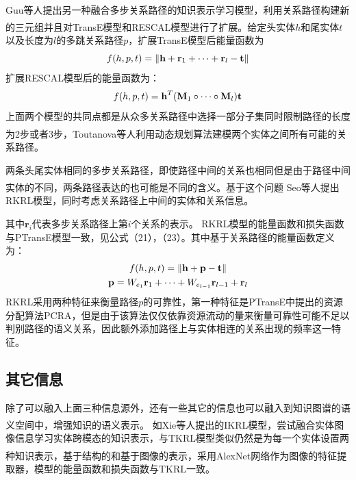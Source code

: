 \documentclass[twocolumn]{article}
\newcommand{\upcite}[1]{\textsuperscript{\textsuperscript{\cite{#1}}}}
\begin{document}
Guu等人\upcite{Guu}提出另一种融合多步关系路径的知识表示学习模型，利用关系路径构建新的三元组并且对TransE模型和RESCAL\upcite{RESCAL}模型进行了扩展。给定头实体$h$和尾实体$t$以及长度为$l$的多跳关系路径$p$，扩展TransE模型后能量函数为
\begin{equation}
	f(h,p,t)=\left \| \textbf{h}+\textbf{r}_1+\cdots+\textbf{r}_l-\textbf{t} \right \| \notag
\end{equation}
扩展RESCAL模型后的能量函数为：
\begin{equation}
	f(h,p,t)=\textbf{h}^T(\textbf{M}_1\circ\cdots\circ\textbf{M}_l)\textbf{t} \notag
\end{equation}
上面两个模型的共同点都是从众多关系路径中选择一部分子集同时限制路径的长度为2步或者3步，Toutanova等人\upcite{Toutanova}利用动态规划算法建模两个实体之间所有可能的关系路径。

两条头尾实体相同的多步关系路径，即使路径中间的关系也相同但是由于路径中间实体的不同，两条路径表达的也可能是不同的含义。基于这个问题
Seo等人\upcite{RKRL}提出RKRL模型，同时考虑关系路径上中间的实体和关系信息。

其中$\textbf{r}_i$代表多步关系路径上第$i$个关系的表示。
RKRL模型的能量函数和损失函数与PTransE模型一致，见公式（21），（23）。其中基于关系路径的能量函数定义为：
\begin{gather}
f(h,p,t)=\left \|\textbf{h}+\textbf{p}-\textbf{t} \right \| \notag \\
\textbf{p}=W_{e_1}\textbf{r}_1+\cdots+W_{e_{l-1}}\textbf{r}_{l-1}+\textbf{r}_l \notag
\end{gather}
RKRL采用两种特征来衡量路径$p$的可靠性，第一种特征是PTransE中提出的资源分配算法PCRA，但是由于该算法仅仅依靠资源流动的量来衡量可靠性可能不足以判别路径的语义关系，因此额外添加路径上与实体相连的关系出现的频率这一特征。


\subsection{其它信息}
除了可以融入上面三种信息源外，还有一些其它的信息也可以融入到知识图谱的语义空间中，增强知识的语义表示。
如Xie等人\upcite{IKRL}提出的IKRL模型，尝试融合实体图像信息学习实体跨模态的知识表示，与TKRL模型类似仍然是为每一个实体设置两种知识表示，基于结构的和基于图像的表示，采用AlexNet\upcite{Alexnet}网络作为图像的特征提取器，模型的能量函数和损失函数与TKRL一致。
\end{document}
